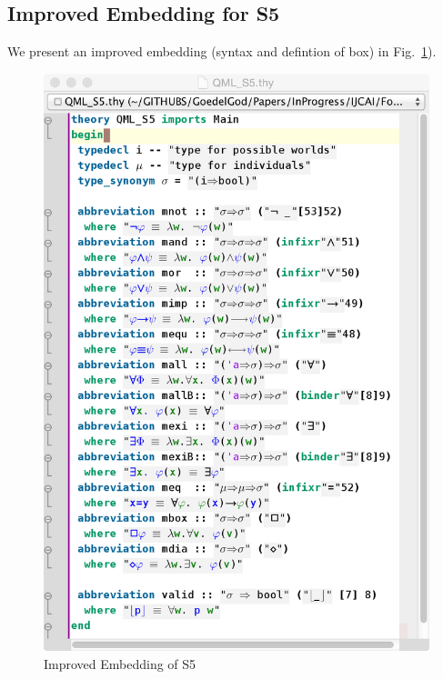 \documentclass{article}
\begin{document}
\subsection{Improved Embedding for S5}
We present an improved embedding (syntax and defintion of box) in  Fig.~\ref{QMLS5}).
\begin{figure}
\centerline{\includegraphics[width=\columnwidth]{./Images/QMLS5.png}}
\caption{Improved Embedding of S5} \label{QMLS5}
\end{figure}
\end{document}
